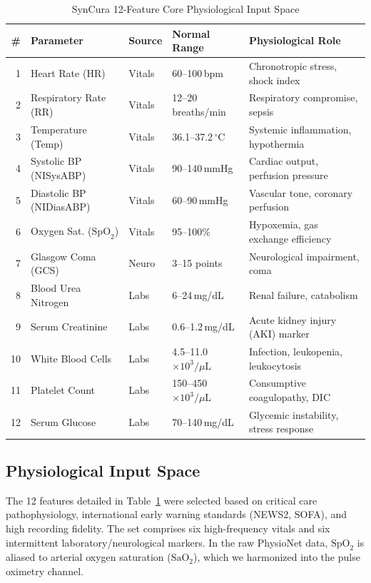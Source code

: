 \documentclass[conference]{IEEEtran}
\begin{document}
\begin{table}[htbp]
\caption{SynCura 12-Feature Core Physiological Input Space}
\label{tab:features}
\centering
\footnotesize
\setlength{\tabcolsep}{4pt}
\begin{tabular}{rllll}
\toprule
\textbf{\#} & \textbf{Parameter} & \textbf{Source} & \textbf{Normal Range} & \textbf{Physiological Role} \\
\midrule
1 & Heart Rate (HR) & Vitals & 60--100\,bpm & Chronotropic stress, shock index \\
2 & Respiratory Rate (RR) & Vitals & 12--20\,breaths/min & Respiratory compromise, sepsis \\
3 & Temperature (Temp) & Vitals & 36.1--37.2\,$^{\circ}\text{C}$ & Systemic inflammation, hypothermia \\
4 & Systolic BP (NISysABP) & Vitals & 90--140\,mmHg & Cardiac output, perfusion pressure \\
5 & Diastolic BP (NIDiasABP) & Vitals & 60--90\,mmHg & Vascular tone, coronary perfusion \\
6 & Oxygen Sat. ($\text{SpO}_2$) & Vitals & 95--100\% & Hypoxemia, gas exchange efficiency \\
7 & Glasgow Coma (GCS) & Neuro & 3--15 points & Neurological impairment, coma \\
8 & Blood Urea Nitrogen & Labs & 6--24\,mg/dL & Renal failure, catabolism \\
9 & Serum Creatinine & Labs & 0.6--1.2\,mg/dL & Acute kidney injury (AKI) marker \\
10 & White Blood Cells & Labs & 4.5--11.0\,$\times 10^3/\mu\text{L}$ & Infection, leukopenia, leukocytosis \\
11 & Platelet Count & Labs & 150--450\,$\times 10^3/\mu\text{L}$ & Consumptive coagulopathy, DIC \\
12 & Serum Glucose & Labs & 70--140\,mg/dL & Glycemic instability, stress response \\
\bottomrule
\end{tabular}
\end{table}

\subsection{Physiological Input Space}
The 12 features detailed in Table~\ref{tab:features} were selected based on critical care pathophysiology, international early warning standards (NEWS2, SOFA), and high recording fidelity. The set comprises six high-frequency vitals and six intermittent laboratory/neurological markers. In the raw PhysioNet data, $\text{SpO}_2$ is aliased to arterial oxygen saturation ($\text{SaO}_2$), which we harmonized into the pulse oximetry channel. 
\end{document}
